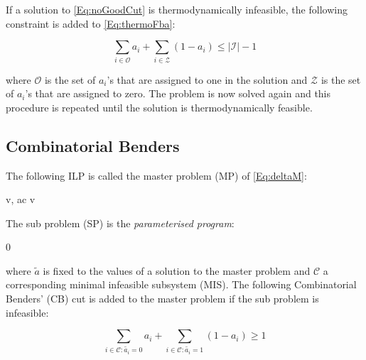 If a solution to \cref{Eq:noGoodCut} is thermodynamically infeasible, the following constraint is added to \cref{Eq:thermoFba}:

\begin{equation} \label{noGoodCut}
\sum_{i \in \mathcal{O}} a_i + \sum_{i \in \mathcal{Z}} (1-a_i) \leq |\mathcal{I}|-1
\end{equation}

where $\mathcal{O}$ is the set of $a_i$'s that are assigned to one in the solution and $\mathcal{Z}$ is the set of $a_i$'s that are assigned to zero. The problem is now solved again and this procedure is repeated until the solution is thermodynamically feasible.

\subsection{Combinatorial Benders}
The following ILP is called the master problem (MP) of \cref{Eq:deltaM}: 
\begin{maxi!}
    {\scriptstyle v, a}{c \tran v}{\label{Eq:masterProblem}}{} 
          
\end{maxi!}

 The sub problem (SP) is the \textit{parameterised program}:
\begin{maxi!}
    {\scriptstyle \mu}{0}{\label{Eq:subProblem}}{} 
\end{maxi!}

where $\widetilde{a}$ is fixed to the values of a solution to the master problem and $\mathcal{C}$ a corresponding minimal infeasible subsystem (MIS). The following Combinatorial Benders' (CB) cut is added to the master problem if the sub problem is infeasible:

\begin{equation*}
\sum_{i \in \mathcal{C}: \widetilde{a_i}=0} a_i + \sum_{i \in \mathcal{C}: \widetilde{a_i}=1} (1-a_i) \geq 1
\end{equation*}

